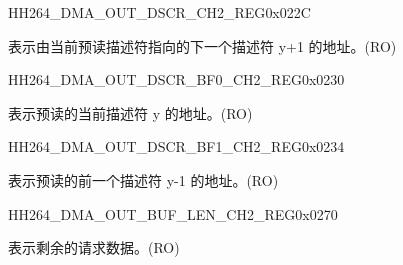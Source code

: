 \begin{register}{H}{H264\_DMA\_OUT\_DSCR\_CH2\_REG}{0x022C}\label{regdesc:H264DMAOUTDSCRCH2REG}
%
\regnewline%
\begin{regdesc}\begin{reglist}
\label{fielddesc:H264DMAOUTLINKDSCRCH2}\item [H264\_DMA\_OUTLINK\_DSCR\_CH2] 表示由当前预读描述符指向的下一个描述符 y+1 的地址。(RO)
\end{reglist}\end{regdesc}
\end{register}


\begin{register}{H}{H264\_DMA\_OUT\_DSCR\_BF0\_CH2\_REG}{0x0230}\label{regdesc:H264DMAOUTDSCRBF0CH2REG}
%
\regnewline%
\begin{regdesc}\begin{reglist}
\label{fielddesc:H264DMAOUTLINKDSCRBF0CH2}\item [H264\_DMA\_OUTLINK\_DSCR\_BF0\_CH2] 表示预读的当前描述符 y 的地址。(RO)
\end{reglist}\end{regdesc}
\end{register}


\begin{register}{H}{H264\_DMA\_OUT\_DSCR\_BF1\_CH2\_REG}{0x0234}\label{regdesc:H264DMAOUTDSCRBF1CH2REG}
%
\regnewline%
\begin{regdesc}\begin{reglist}
\label{fielddesc:H264DMAOUTLINKDSCRBF1CH2}\item [H264\_DMA\_OUTLINK\_DSCR\_BF1\_CH2] 表示预读的前一个描述符 y-1 的地址。(RO)
\end{reglist}\end{regdesc}
\end{register}

\begin{register}{H}{H264\_DMA\_OUT\_BUF\_LEN\_CH2\_REG}{0x0270}\label{regdesc:H264DMAOUTBUFLENCH2REG}
%
%
\regnewline%
\begin{regdesc}\begin{reglist}
\label{fielddesc:H264DMAOUTCMDFIFOBUFLENHBCH2}\item [H264\_DMA\_OUT\_CMDFIFO\_BUF\_LEN\_HB\_CH2] 表示剩余的请求数据。(RO)
\end{reglist}\end{regdesc}
\end{register}


